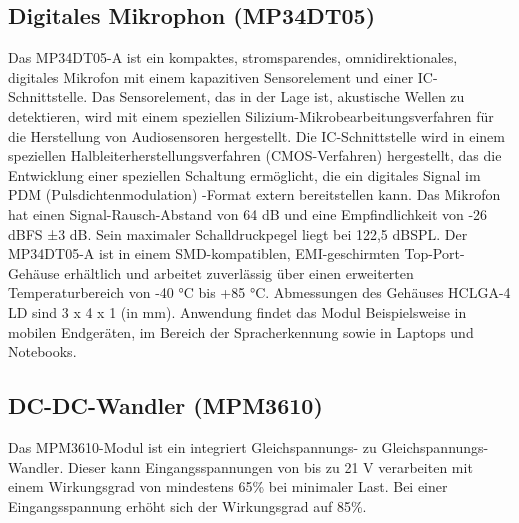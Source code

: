 \subsection{Digitales Mikrophon (MP34DT05)}
Das MP34DT05-A ist ein kompaktes, stromsparendes, omnidirektionales, digitales
Mikrofon mit einem kapazitiven Sensorelement und einer IC-Schnittstelle.
Das Sensorelement, das in der Lage ist, akustische Wellen zu detektieren, wird mit
einem speziellen Silizium-Mikrobearbeitungsverfahren für die Herstellung von
Audiosensoren hergestellt. Die IC-Schnittstelle wird in einem speziellen Halbleiterherstellungsverfahren (CMOS-Verfahren) hergestellt, das die Entwicklung einer speziellen Schaltung ermöglicht, die ein digitales Signal im PDM (Pulsdichtenmodulation) -Format extern bereitstellen kann. Das Mikrofon hat einen Signal-Rausch-Abstand von 64 dB und eine Empfindlichkeit von -26 dBFS ±3 dB. Sein maximaler Schalldruckpegel liegt bei 122,5 dBSPL. Der MP34DT05-A ist in einem SMD-kompatiblen, EMI-geschirmten Top-Port-Gehäuse erhältlich und arbeitet zuverlässig über einen erweiterten Temperaturbereich von -40 °C bis +85 °C. Abmessungen des Gehäuses HCLGA-4 LD sind 3 x 4 x 1 (in mm). Anwendung findet das Modul Beispielsweise in mobilen Endgeräten, im Bereich der Spracherkennung sowie in Laptops und Notebooks.\cite{STM3.2021}\cite{Ard.2024}

\subsection{DC-DC-Wandler (MPM3610)}
Das MPM3610-Modul ist ein integriert Gleichspannungs- zu Gleichspannungs-Wandler. Dieser kann Eingangsspannungen von bis zu 21 V verarbeiten mit einem Wirkungsgrad von mindestens 65\% bei minimaler Last. Bei einer Eingangsspannung erhöht sich der Wirkungsgrad auf 85\%.\cite{Ard.2024}

